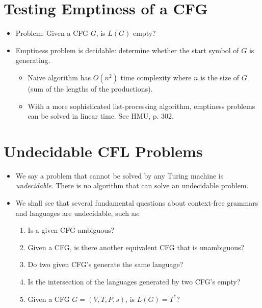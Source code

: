 \documentclass[]{article}
\begin{document}
\section{Testing Emptiness of a CFG}
  \begin{itemize}
    \item Problem: Given a CFG $G$, is $L(G)$ empty?
    \item Emptiness problem is decidable: determine whether the start symbol of
    $G$ is generating.
      \begin{itemize}
        \item Naive algorithm has $O(n^2)$ time complexity where $n$ is the 
        size of $G$ (sum of the lengths of the productions).
        \item With a more sophisticated list-processing algorithm, emptiness 
        problems can be solved in linear time. See HMU, p. 302.
      \end{itemize}
  \end{itemize}
  
\section{Undecidable CFL Problems}
  \begin{itemize}
    \item We say a problem that cannot be solved by any Turing machine is
    \emph{undecidable}. There is no algorithm that can solve an undecidable
    problem.
    \item We shall see that several fundamental questions about context-free
    grammars and languages are undecidable, such as:
      \begin{enumerate}
        \item Is a given CFG ambiguous?
        \item Given a CFG, is there another equivalent CFG that is 
        unambiguous?
        \item Do two given CFG's generate the same language?
        \item Is the intersection of the languages generated by two CFG's 
        empty?
        \item Given a CFG $G = (V,T,P,s)$, is $L(G) = T^*$?
      \end{enumerate}
  \end{itemize}
\end{document}
